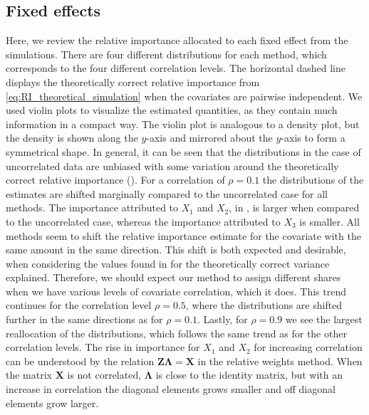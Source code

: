 \subsection{Fixed effects}
\label{sec:relimp_fixed}
Here, we review the relative importance allocated to each fixed effect from the simulations.
There are four different distributions for each method, which corresponds to the four different correlation levels. 
The horizontal dashed line displays the theoretically correct relative importance from \eqref{eq:RI_theoretical_simulation} when the covariates are pairwise independent. We used violin plots to visualize the estimated quantities, as they contain much information in a compact way. The violin plot is analogous to a density plot, but the density is shown along the $y$-axis and mirrored about the $y$-axis to form a symmetrical shape.
\newline
\newline
In general, it can be seen that the distributions in the case of uncorrelated data are unbiased with some variation around the theoretically correct relative importance ().
For a correlation of $\rho=0.1$ the distributions of the estimates are shifted marginally compared to the uncorrelated case for all methods.
The importance attributed to $X_1$ and $X_2$, in , is larger when compared to the uncorrelated case, whereas the importance attributed to $X_3$ is smaller.
All methods seem to shift the relative importance estimate for the covariate with the same amount in the same direction.
This shift is both expected and desirable, when considering the values found in  for the theoretically correct variance explained. 
Therefore, we should expect our method to assign different shares when we have various levels of covariate correlation, which it does.
This trend continues for the correlation level $\rho=0.5$, where the distributions are shifted further in the same directions as for $\rho=0.1$.
Lastly, for $\rho=0.9$ we see the largest reallocation of the distributions, which follows the same trend as for the other correlation levels.
\newline
\newline
The rise in importance for $X_1$ and $X_2$ for increasing correlation can be understood by the relation $\mathbf{Z}\boldsymbol{\Lambda}=\mathbf{X}$ in the relative weights method. 
When the matrix $\mathbf{X}$ is not correlated, $\boldsymbol{\Lambda}$ is close to the identity matrix, but with an increase in correlation the diagonal elements grows smaller and off diagonal elements grow larger.
